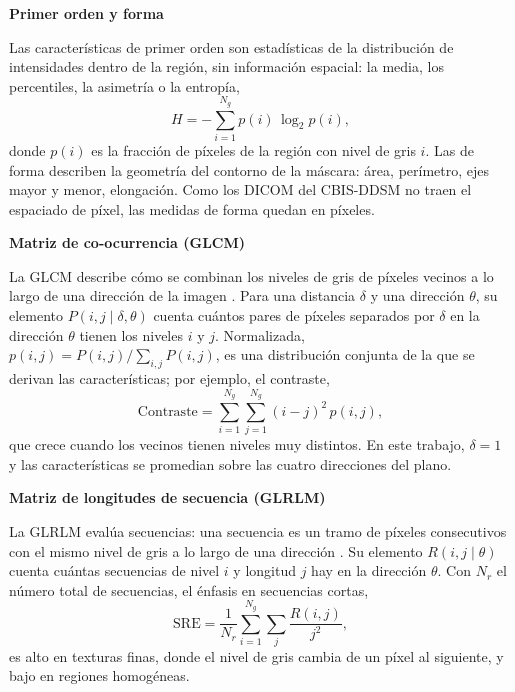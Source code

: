 \textbf{Primer orden y forma}

Las características de primer orden son estadísticas de la distribución de intensidades dentro de la región, sin información espacial: la media, los percentiles, la asimetría o la entropía,
\begin{equation}
  H = -\sum_{i=1}^{N_g} p(i)\,\log_2 p(i),
  \label{eq:entropia_radiomica}
\end{equation}
donde $p(i)$ es la fracción de píxeles de la región con nivel de gris $i$. Las de forma describen la geometría del contorno de la máscara: área, perímetro, ejes mayor y menor, elongación. Como los DICOM del CBIS-DDSM no traen el espaciado de píxel, las medidas de forma quedan en píxeles.

\textbf{Matriz de co-ocurrencia (GLCM)}

La GLCM describe cómo se combinan los niveles de gris de píxeles vecinos a lo largo de una dirección de la imagen \cite{Zwanenburg2020IBSI}. Para una distancia $\delta$ y una dirección $\theta$, su elemento $P(i,j \mid \delta,\theta)$ cuenta cuántos pares de píxeles separados por $\delta$ en la dirección $\theta$ tienen los niveles $i$ y $j$. Normalizada, $p(i,j) = P(i,j)/\sum_{i,j}P(i,j)$, es una distribución conjunta de la que se derivan las características; por ejemplo, el contraste,
\begin{equation}
  \text{Contraste} = \sum_{i=1}^{N_g}\sum_{j=1}^{N_g} (i-j)^2\, p(i,j),
  \label{eq:glcm_contraste}
\end{equation}
que crece cuando los vecinos tienen niveles muy distintos. En este trabajo, $\delta = 1$ y las características se promedian sobre las cuatro direcciones del plano.

\textbf{Matriz de longitudes de secuencia (GLRLM)}

La GLRLM evalúa secuencias: una secuencia es un tramo de píxeles consecutivos con el mismo nivel de gris a lo largo de una dirección \cite{Zwanenburg2020IBSI}. Su elemento $R(i,j \mid \theta)$ cuenta cuántas secuencias de nivel $i$ y longitud $j$ hay en la dirección $\theta$. Con $N_r$ el número total de secuencias, el énfasis en secuencias cortas,
\begin{equation}
  \text{SRE} = \frac{1}{N_r}\sum_{i=1}^{N_g}\sum_{j} \frac{R(i,j)}{j^2},
  \label{eq:glrlm_sre}
\end{equation}
es alto en texturas finas, donde el nivel de gris cambia de un píxel al siguiente, y bajo en regiones homogéneas.
